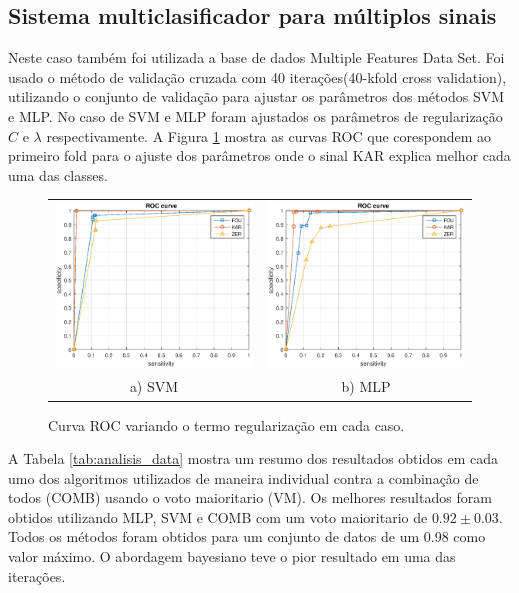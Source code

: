 \documentclass[12pt]{article}
\begin{document}
\subsection{Sistema multiclasificador para múltiplos sinais}

Neste caso também  foi utilizada a base de dados Multiple Features Data Set. Foi usado o método de validação cruzada com 40 iterações(40-kfold cross validation),  utilizando o conjunto de validação para ajustar os parâmetros dos métodos SVM e MLP. No caso de SVM e MLP  foram ajustados os parâmetros de regularização $C$ e $\lambda$ respectivamente. A Figura \ref{fig:roc_curve} mostra as curvas ROC  que corespondem ao primeiro fold para o ajuste dos parâmetros onde o sinal KAR explica melhor cada uma das classes.


\begin{figure}[!h]
\centering
\begin{tabular}{cc}
\includegraphics[width=2.5in]{../out/svm-roc.eps}&
\includegraphics[width=2.5in]{../out/mlp-roc.eps} \\
a) SVM  & b) MLP
\end{tabular}
\caption{Curva ROC variando o termo regularização em cada caso.}
\label{fig:roc_curve}
\end{figure}
 
 
 
A Tabela \ref{tab:analisis_data} mostra um resumo dos resultados obtidos em cada umo dos algoritmos utilizados de maneira individual contra a combinação de todos (COMB) usando o  voto maioritario (VM). Os melhores resultados foram obtidos utilizando MLP, SVM e COMB com um voto maioritario de $0.92 \pm 0.03$. Todos os métodos foram obtidos para um conjunto de datos de um 0.98 como valor máximo. O abordagem bayesiano teve o pior resultado em uma das iterações.
 
\end{document}
